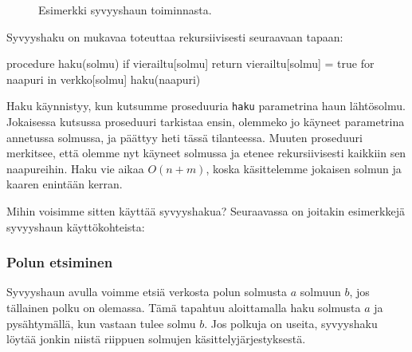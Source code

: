 \begin{figure}
\begin{center}
\end{center}
\caption{Esimerkki syvyyshaun toiminnasta.}
\label{fig:syvhak}
\end{figure}

Syvyyshaku on mukavaa toteuttaa rekursiivisesti seuraavaan tapaan:

\begin{code}
procedure haku(solmu)
    if vierailtu[solmu]
        return
    vierailtu[solmu] = true
    for naapuri in verkko[solmu]
        haku(naapuri)
\end{code}

Haku käynnistyy, kun kutsumme proseduuria
\texttt{haku} parametrina haun lähtö\-solmu.
Jokaisessa kutsussa proseduuri tarkistaa ensin,
olemmeko jo käy\-neet parametrina annetussa solmussa,
ja päättyy heti tässä tilanteessa.
Muuten proseduuri merkitsee, että olemme nyt käyneet solmussa
ja etenee rekursiivisesti kaikkiin sen naapureihin.
Haku vie aikaa $O(n+m)$, koska käsitte\-lemme jokaisen
solmun ja kaaren enintään kerran.

Mihin voisimme sitten käyttää syvyyshakua?
Seuraavassa on joitakin esimerkkejä syvyyshaun käyttökohteista:

\subsubsection{Polun etsiminen}

Syvyyshaun avulla voimme etsiä verkosta polun solmusta
$a$ solmuun $b$, jos tällainen polku on olemassa.
Tämä tapahtuu aloittamalla haku solmusta $a$
ja pysähtymällä, kun vastaan tulee solmu $b$.
Jos polkuja on useita, syvyyshaku löytää jonkin niistä
riippuen solmujen käsittelyjärjestyksestä.

